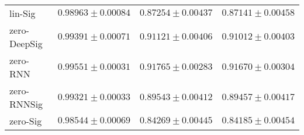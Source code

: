 \begin{tabular}{llll}
lin-Sig        &                           $ 0.98963 \pm 0.00084 $ &                           $ 0.87254 \pm 0.00437 $ &                           $ 0.87141 \pm 0.00458 $ \\
zero-DeepSig   &                           $ 0.99391 \pm 0.00071 $ &                           $ 0.91121 \pm 0.00406 $ &                           $ 0.91012 \pm 0.00403 $ \\
zero-RNN       &                           $ 0.99551 \pm 0.00031 $ &                           $ 0.91765 \pm 0.00283 $ &                           $ 0.91670 \pm 0.00304 $ \\
zero-RNNSig    &                           $ 0.99321 \pm 0.00033 $ &                           $ 0.89543 \pm 0.00412 $ &                           $ 0.89457 \pm 0.00417 $ \\
zero-Sig       &                           $ 0.98544 \pm 0.00069 $ &                           $ 0.84269 \pm 0.00445 $ &                           $ 0.84185 \pm 0.00454 $ \\
\bottomrule
\end{tabular}
